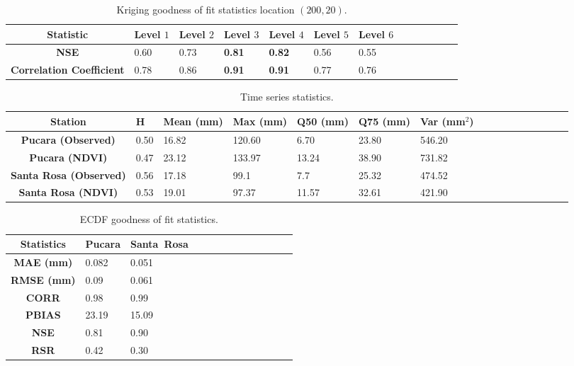 {\begin{table}[!htbp] 
\caption{Kriging goodness of fit statistics location $(200,20)$.}
\vspace*{-0.15in}
\label{table:Krig_goddness_200_20}
\vskip4mm
\centering
\begin{tabularx}{\columnwidth}{@{}>{\bfseries}c*{12}{X}@{}}
\hline \hline
 Statistic & Level $1$ & Level $2$ & Level $3$ & Level $4$ & Level $5$ & Level $6$ \\
\hline \hline
NSE & 0.60&0.73&{\bf 0.81}& {\bf 0.82}&0.56&0.55 \\
\hline
Correlation Coefficient &0.78&0.86&{\bf 0.91}&{\bf 0.91}&0.77&0.76 \\
\hline
\end{tabularx}
\end{table}

\begin{table}[!htbp] 
\caption{Time series statistics.}
\vspace*{-0.15in}
\label{table:PucStaRosaTimeseriestable}
\vskip4mm
\centering
\begin{tabularx}{\columnwidth}{@{}>{\bfseries}c*{15}{X}@{}}
\hline \hline
 Station	& H & Mean {\footnotesize  (mm)} & Max {\footnotesize (mm)} & Q50 {\footnotesize (mm)} &  Q75 {\footnotesize (mm)} & Var {\footnotesize (mm$^2$)}  \\
\hline \hline
Pucara (Observed)& 0.50&	16.82&	120.60&	6.70&	23.80&	546.20\\
Pucara (NDVI)& 0.47&	23.12&	133.97&	13.24&	38.90&	731.82\\
\hline
Santa Rosa (Observed)&  0.56 & 17.18&  99.1&	 7.7&	25.32& 474.52\\	
Santa Rosa (NDVI)&  0.53& 19.01&  97.37& 11.57&	32.61&	421.90\\
\hline
\end{tabularx}
\end{table}


\begin{table}[!htbp] 
\caption{ECDF goodness of fit statistics.}
\vspace*{-0.15in}
\label{table:PucStaRosaTimeseriesGoF}
\vskip4mm
\centering
\begin{tabularx}{6cm}{@{}>{\bfseries}c*{12}{X}@{}}
\hline \hline
 Statistics  & Pucara & Santa~Rosa   \\
\hline \hline
MAE (mm) &  0.082   &  0.051 \\ 
\hline
RMSE (mm) &  0.09   &  0.061\\
\hline
CORR & 	0.98   &  0.99 \\
\hline
PBIAS & 23.19  & 15.09\\
\hline
NSE &  0.81    & 0.90\\
\hline
RSR & 	0.42   & 0.30\\
\hline
\end{tabularx}
\end{table}

}
